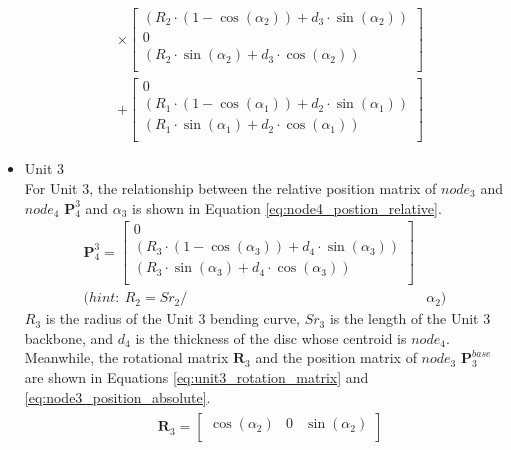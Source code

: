 \begin{itemize}
\begin{align}
        &\times
        \begin{bmatrix}
            (R_2\cdot(1-\cos(\alpha_2)) + d_3\cdot \sin(\alpha_2)) \\
            0 \\
            (R_2\cdot \sin(\alpha_2) + d_3\cdot \cos(\alpha_2)) \\
        \end{bmatrix} \nonumber \\
        &+
        \begin{bmatrix}
            0 \\
            (R_1\cdot(1-\cos(\alpha_1)) + d_2\cdot \sin(\alpha_1)) \\
            (R_1\cdot \sin(\alpha_1) + d_2\cdot \cos(\alpha_1)) \\
        \end{bmatrix}
        \label{eq:node3_position_absolute}
    \end{align}
    \item Unit 3 \\
    For Unit 3, the relationship between the relative position matrix of $node_3$ and $node_4$ $\textbf{P}_{4}^{3}$ and 
    $\alpha_3$ is shown in Equation \ref{eq:node4_postion_relative}.
    \begin{align}
        \textbf{P}_{4}^{3} = 
        \begin{bmatrix}
            0 \\
            (R_3\cdot(1-\cos(\alpha_3)) + d_4\cdot \sin(\alpha_3)) \\
            (R_3\cdot \sin(\alpha_3) + d_4\cdot \cos(\alpha_3)) \\
        \end{bmatrix}&
        \label{eq:node4_postion_relative} \\
        \nonumber (hint: \ R_2 = {Sr}_2/ &\alpha_2)
    \end{align}
    $R_3$ is the radius of the Unit 3 bending curve, ${Sr}_3$ is the length of the Unit 3 backbone, and $d_4$ is the thickness 
    of the disc whose centroid is $node_4$. Meanwhile, the rotational matrix $\textbf{R}_{3}$ and the position matrix of 
    $node_3$ $\textbf{P}_{3}^{base}$ are shown in Equations \ref*{eq:unit3_rotation_matrix} and \ref{eq:node3_position_absolute}.
    \begin{align}
        &\begin{aligned}
            \textbf{R}_{3} = 
            \begin{bmatrix}
                \cos(\alpha_2) & 0 & \sin(\alpha_2) \\

\end{bmatrix}
\end{aligned}
\end{align}
\end{itemize}
